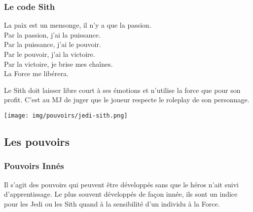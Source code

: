 \subsubsection{Le code Sith}
\begin{quotebox}
La paix est un mensonge, il n’y a que la passion. \\
Par la passion, j’ai la puissance. \\
Par la puissance, j’ai le pouvoir. \\
Par le pouvoir, j’ai la victoire. \\
Par la victoire, je brise mes chaînes. \\
La Force me libérera.
\end{quotebox}

Le Sith doit laisser libre court à ses émotions et n’utilise la force que pour son profit. C’est au MJ de juger que le joueur respecte le roleplay de son personnage.

\begin{center}
	\vspace*{\fill}
	\texttt{[image: img/pouvoirs/jedi-sith.png]}
	\vspace*{\fill}
\end{center}

\clearpage
\subsection{Les pouvoirs}

\subsubsection{Pouvoirs Innés}
Il s’agit des pouvoirs qui peuvent être développés sans que le héros n’ait suivi d’apprentissage. Le plus souvent développés de façon innée, ils sont un indice pour les Jedi ou les Sith quand à la sensibilité d’un individu à la Force.

